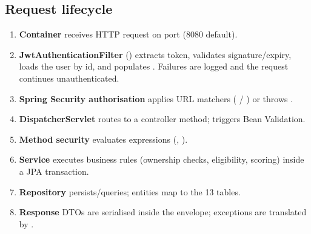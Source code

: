 \subsection{Request lifecycle}

\begin{enumerate}
    \item \textbf{Container} receives HTTP request on port  (8080 default).
    \item \textbf{JwtAuthenticationFilter} () extracts  token, validates signature/expiry, loads the user by id, and populates . Failures are logged and the request continues unauthenticated.
    \item \textbf{Spring Security authorisation} applies URL matchers ( / ) or throws .
    \item \textbf{DispatcherServlet} routes to a controller method;  triggers Bean Validation.
    \item \textbf{Method security} evaluates  expressions (, ).
    \item \textbf{Service} executes business rules (ownership checks, eligibility, scoring) inside a JPA transaction.
    \item \textbf{Repository} persists/queries; entities map to the 13 tables.
    \item \textbf{Response} DTOs are serialised inside the  envelope; exceptions are translated by .
\end{enumerate}

